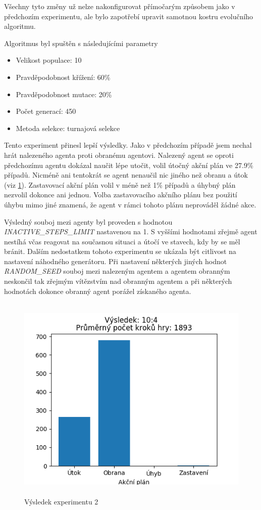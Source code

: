 \par
Všechny tyto změny už nelze nakonfigurovat přímočarým způsobem jako v předchozím experimentu, ale bylo zapotřebí upravit samotnou kostru evolučního algoritmu.
\par
Algoritmus byl spuštěn s následujícími parametry
\begin{itemize}
    \item Velikost populace: 10
    \item Pravděpodobnost křížení: 60\%
    \item Pravděpodobnost mutace: 20\%
    \item Počet generací: 450
    \item Metoda selekce: turnajová selekce
\end{itemize}

Tento experiment přinesl lepší výsledky. Jako v předchozím případě jsem nechal hrát nalezeného agenta proti obranému agentovi.
Nalezený agent se oproti předchozímu agentu dokázal naučit lépe utočit, volil útočný akční plán ve 27.9\% případů. 
Nicméně ani tentokrát se agent nenaučil nic jiného než obranu a útok (viz \ref{obr04:Výsledek experimentu 02}). 
Zastavovací akční plán volil v méně než 1\% případů a úhybný plán nezvolil dokonce ani jednou. Volba zastavovacího akčního plánu bez použití úhybu mimo jiné znamená, že agent v rámci tohoto plánu neprováděl žádné akce.
\par
Výsledný souboj mezi agenty byl proveden s hodnotou \emph{\uppercase{inactive\_steps\_limit}} nastavenou na 1.
S vyššími hodnotami zřejmě agent nestíhá včas reagovat na současnou situaci a útočí ve stavech, kdy by se měl bránit.
Dalším nedostatkem tohoto experimentu se ukázala být citlivost na nastavení náhodného generátoru. Při nastavení některých jiných hodnot \emph{\uppercase{random\_seed}} souboj mezi nalezeným agentem a agentem obranným neskončil tak zřejmým vítězstvím nad obranným agentem a při některých hodnotách dokonce obranný agent porážel získaného agenta.

 


\begin{figure}[p]\centering
\includegraphics[width=125mm, height=100mm]{./Obrazky/Experiment02Results.png}
\caption{Výsledek experimentu 2}
\label{obr04:Výsledek experimentu 02}
\end{figure}







